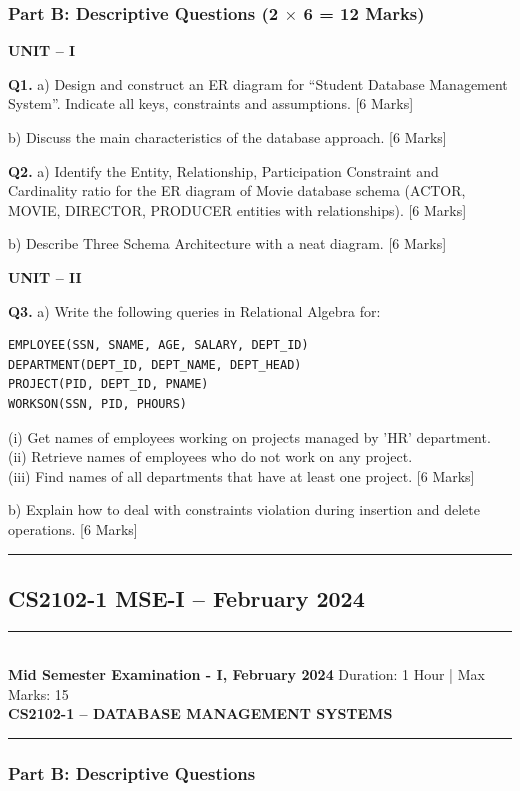 \documentclass[11pt,a4paper]{article}
\newcommand{\examheader}[4]{
\noindent\rule{\textwidth}{0.5pt}\\
\textbf{#1} \hfill Duration: #3 | Max Marks: #4\\
\textbf{#2}\\
\rule{\textwidth}{0.5pt}
\vspace{0.2cm}
}
\begin{document}
\subsubsection*{Part B: Descriptive Questions (2 $\times$ 6 = 12 Marks)}

\textbf{UNIT -- I}

\textbf{Q1.} a) Design and construct an ER diagram for ``Student Database Management System''. Indicate all keys, constraints and assumptions. \hfill [6 Marks]

b) Discuss the main characteristics of the database approach. \hfill [6 Marks]

\textbf{Q2.} a) Identify the Entity, Relationship, Participation Constraint and Cardinality ratio for the ER diagram of Movie database schema (ACTOR, MOVIE, DIRECTOR, PRODUCER entities with relationships). \hfill [6 Marks]

b) Describe Three Schema Architecture with a neat diagram. \hfill [6 Marks]

\textbf{UNIT -- II}

\textbf{Q3.} a) Write the following queries in Relational Algebra for:
\begin{verbatim}
EMPLOYEE(SSN, SNAME, AGE, SALARY, DEPT_ID)
DEPARTMENT(DEPT_ID, DEPT_NAME, DEPT_HEAD)
PROJECT(PID, DEPT_ID, PNAME)
WORKSON(SSN, PID, PHOURS)
\end{verbatim}
(i) Get names of employees working on projects managed by 'HR' department.\\
(ii) Retrieve names of employees who do not work on any project.\\
(iii) Find names of all departments that have at least one project. \hfill [6 Marks]

b) Explain how to deal with constraints violation during insertion and delete operations. \hfill [6 Marks]

\vspace{0.5cm}
\hrule
\vspace{0.5cm}

\subsection{CS2102-1 MSE-I -- February 2024}
\examheader{Mid Semester Examination - I, February 2024}{CS2102-1 -- DATABASE MANAGEMENT SYSTEMS}{1 Hour}{15}

\subsubsection*{Part B: Descriptive Questions}
\end{document}
